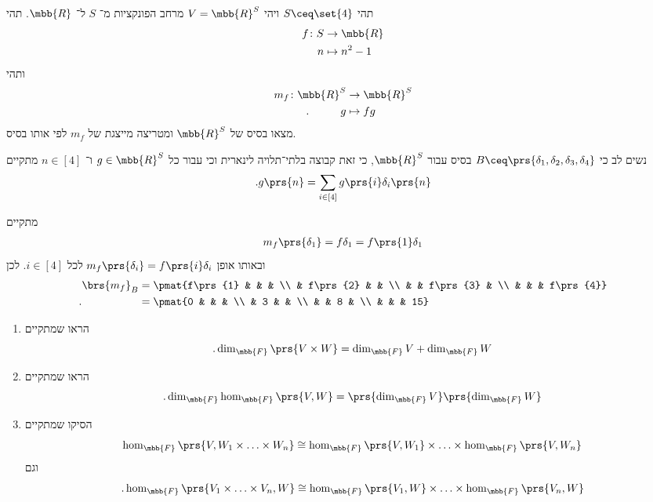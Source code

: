 \documentclass[a4paper,10pt,oneside,openany]{article}
\begin{document}
\begin{exercise}
תהי
$S \ceq \set{4}$
ויהי
$V = \mbb{R}^S$
מרחב הפונקציות מ־%
$S$
ל־%
$\mbb{R}$.
תהי
\begin{align*}
f \colon S &\to \mbb{R} \\
n &\mapsto n^2 - 1
\end{align*}
ותהי
\begin{align*}
m_f \colon \mbb{R}^S &\to \mbb{R}^S \\
\text{.} \hphantom{lalalal} g &\mapsto fg
\end{align*}
מצאו בסיס של
$\mbb{R}^S$
ומטריצה מייצגת של $m_f$ לפי אותו בסיס.
\end{exercise}

\begin{solution}
נשים לב כי
$B \ceq \prs{\delta_1, \delta_2, \delta_3, \delta_4}$
בסיס עבור
$\mbb{R}^S$,
כי זאת קבוצה בלתי־תלויה לינארית וכי עבור כל
$g \in \mbb{R}^S$
ו־%
$n \in [4]$
מתקיים
\[\text{.} g\prs{n} = \sum_{i \in [4]} g\prs{i} \delta_i\prs{n}\]

מתקיים
\begin{align*}
m_f\prs{\delta_1} = f\delta_1 = f\prs{1} \delta_1
\end{align*}
ובאותו אופן
$m_f\prs{\delta_i} = f\prs{i} \delta_i$
לכל
$i \in [4]$.
לכן
\begin{align*}
\brs{m_f}_B &= \pmat{f\prs{1} & & & \\ & f\prs{2} & & \\ & & f\prs{3} & \\ & & & f\prs{4}}
\\ \text{.} \hphantom{\brs{m_f}_B} &= \pmat{0 & & & \\ & 3 & & \\ & & 8 & \\ & & & 15}
\end{align*}
\end{solution}

\begin{exercise}
\begin{enumerate}
\item הראו שמתקיים
\[\text{.} \dim_{\mbb{F}} \prs{V \times W} = \dim_{\mbb{F}} V + \dim_{\mbb{F}} W\]
\item הראו שמתקיים
\[\text{.} \dim_{\mbb{F}} \hom_{\mbb{F}}\prs{V,W} = \prs{\dim_{\mbb{F}} V}\prs{\dim_{\mbb{F}} W}\]
\item הסיקו שמתקיים
\[\hom_{\mbb{F}}\prs{V, W_1 \times \ldots \times W_n} \cong \hom_{\mbb{F}}\prs{V, W_1} \times \ldots \times \hom_{\mbb{F}}\prs{V, W_n}\]
וגם
\[\text{.} \hom_{\mbb{F}}\prs{V_1 \times \ldots \times V_n, W} \cong \hom_{\mbb{F}}\prs{V_1, W} \times \ldots \times \hom_{\mbb{F}}\prs{V_n, W}\]
\end{enumerate}
\end{exercise}
\end{document}
